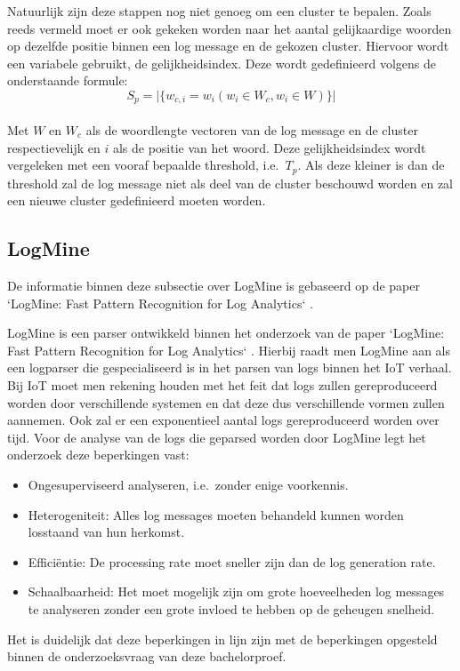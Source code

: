 Natuurlijk zijn deze stappen nog niet genoeg om een cluster te bepalen. Zoals reeds vermeld moet er ook gekeken worden naar het aantal gelijkaardige woorden op dezelfde positie binnen een log message en de gekozen cluster. Hiervoor wordt een variabele gebruikt, de gelijkheidsindex. Deze wordt gedefinieerd volgens de onderstaande formule: 
\[S_{p} = \lvert \{w_{c,i} = w_{i}(w_{i} \in W_{c}, w_{i} \in W)\} \rvert\]\\
Met \(W\) en \(W_{c}\) als de woordlengte vectoren van de log message en de cluster respectievelijk en $i$ als de positie van het woord. Deze gelijkheidsindex wordt vergeleken met een vooraf bepaalde threshold, i.e.\ \(T_{p}\). Als deze kleiner is dan de threshold zal de log message niet als deel van de cluster beschouwd worden en zal een nieuwe cluster gedefinieerd moeten worden.

\subsection{LogMine}
De informatie binnen deze subsectie over LogMine is gebaseerd op de paper `LogMine: Fast Pattern Recognition for Log Analytics` \autocite{hamooni2016logmine}.

LogMine is een parser ontwikkeld binnen het onderzoek van de paper `LogMine: Fast Pattern Recognition for Log Analytics` \autocite{hamooni2016logmine}. Hierbij raadt men LogMine aan als een logparser die gespecialiseerd is in het parsen van logs binnen het IoT verhaal. Bij IoT moet men rekening houden met het feit dat logs zullen gereproduceerd worden door verschillende systemen en dat deze dus verschillende vormen zullen aannemen. Ook zal er een exponentieel aantal logs gereproduceerd worden over tijd. Voor de analyse van de logs die geparsed worden door LogMine legt het onderzoek deze beperkingen vast: 
\begin{itemize}
    \item Ongesuperviseerd analyseren, i.e.\ zonder enige voorkennis.
    \item Heterogeniteit: Alles log messages moeten behandeld kunnen worden losstaand van hun herkomst.
    \item Efficiëntie: De processing rate moet sneller zijn dan de log generation rate.
    \item Schaalbaarheid: Het moet mogelijk zijn om grote hoeveelheden log messages te analyseren zonder een grote invloed te hebben op de geheugen snelheid.
\end{itemize}
Het is duidelijk dat deze beperkingen in lijn zijn met de beperkingen opgesteld binnen de onderzoeksvraag van deze bachelorproef.

